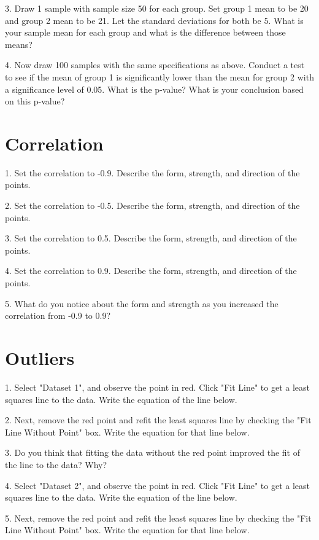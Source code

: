 \documentclass[11pt]{amsart}
\begin{document}
3. Draw 1 sample with sample size 50 for each group. Set group 1 mean to be 20 and group 2 mean to be 21.  Let the standard deviations for both be 5.  What is your sample mean for each group and what is the difference between those means?

4. Now draw 100 samples with the same specifications as above. Conduct a test to see if the mean of group 1 is significantly lower than the mean for group 2 with a significance level of 0.05. What is the p-value? What is your conclusion based on this p-value?




\section{Correlation}
1. Set the correlation to -0.9. Describe the form, strength, and direction of the points.

2. Set the correlation to -0.5. Describe the form, strength, and direction of the points.

3. Set the correlation to 0.5. Describe the form, strength, and direction of the points.

4. Set the correlation to 0.9. Describe the form, strength, and direction of the points.

5. What do you notice about the form and strength as you increased the correlation from -0.9 to 0.9?

\section{Outliers}

1. Select "Dataset 1", and observe the point in red. Click "Fit Line" to get a least squares line to the data. Write the equation of the line below.

2. Next, remove the red point and refit the least squares line by checking the "Fit Line Without Point" box.  Write the equation for that line below. 

3. Do you think that fitting the data without the red point improved the fit of the line to the data? Why?

4. Select "Dataset 2", and observe the point in red. Click "Fit Line" to get a least squares line to the data. Write the equation of the line below.

5. Next, remove the red point and refit the least squares line by checking the "Fit Line Without Point" box.  Write the equation for that line below. 
\end{document}

